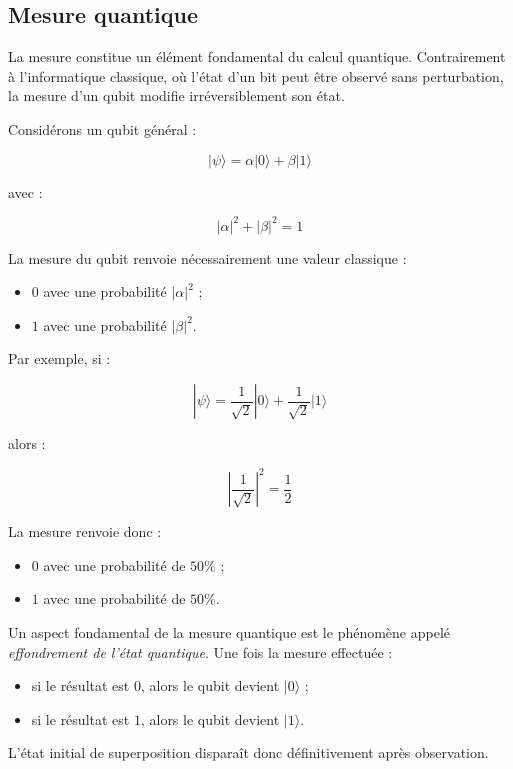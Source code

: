 \documentclass[a4paper,12pt]{article}
\begin{document}
\subsection{Mesure quantique}

La mesure constitue un élément fondamental du calcul quantique. Contrairement à l’informatique classique, où l’état d’un bit peut être observé sans perturbation, la mesure d’un qubit modifie irréversiblement son état.

Considérons un qubit général :

\[
|\psi\rangle
=
\alpha |0\rangle
+
\beta |1\rangle
\]

avec :

\[
|\alpha|^2 + |\beta|^2 = 1
\]

La mesure du qubit renvoie nécessairement une valeur classique :

\begin{itemize}
    \item $0$ avec une probabilité $|\alpha|^2$ ;
    \item $1$ avec une probabilité $|\beta|^2$.
\end{itemize}

Par exemple, si :

\[
|\psi\rangle
=
\frac{1}{\sqrt{2}}|0\rangle
+
\frac{1}{\sqrt{2}}|1\rangle
\]

alors :

\[
\left|
\frac{1}{\sqrt{2}}
\right|^2
=
\frac{1}{2}
\]

La mesure renvoie donc :

\begin{itemize}
    \item $0$ avec une probabilité de $50\%$ ;
    \item $1$ avec une probabilité de $50\%$.
\end{itemize}

Un aspect fondamental de la mesure quantique est le phénomène appelé \textit{effondrement de l’état quantique}. Une fois la mesure effectuée :

\begin{itemize}
    \item si le résultat est $0$, alors le qubit devient $|0\rangle$ ;
    \item si le résultat est $1$, alors le qubit devient $|1\rangle$.
\end{itemize}

L’état initial de superposition disparaît donc définitivement après observation.
\end{document}
